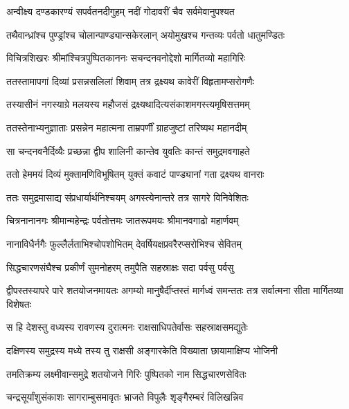 \twolineshloka
{अन्वीक्ष्य दण्डकारण्यं सपर्वतनदीगुहम्}
{नदीं गोदावरीं चैव सर्वमेवानुपश्यत} %

\twolineshloka
{तथैवान्ध्रांश्च पुण्ड्रांश्च चोलान्पाण्ड्यान्सकेरलान्}
{अयोमुखश्च गन्तव्यः पर्वतो धातुमण्डितः} %

\twolineshloka
{विचित्रशिखरः श्रीमांश्चित्रपुष्पितकाननः}
{सचन्दनवनोद्देशो मार्गितव्यो महागिरिः} %

\twolineshloka
{ततस्तामापगां दिव्यां प्रसन्नसलिलां शिवाम्}
{तत्र द्रक्ष्यथ कावेरीं विहृतामप्सरोगणैः} %

\twolineshloka
{तस्यासीनं नगस्याग्रे मलयस्य महौजसं}
{द्रक्ष्यथादित्यसंकाशमगस्त्यमृषिसत्तमम्} %

\twolineshloka
{ततस्तेनाभ्यनुज्ञाताः प्रसन्नेन महात्मना}
{ताम्रपर्णीं ग्राहजुष्टां तरिष्यथ महानदीम्} %

\twolineshloka
{सा चन्दनवनैर्दिव्यैः प्रच्छन्ना द्वीप शालिनी}
{कान्तेव युवतिः कान्तं समुद्रमवगाहते} %

\twolineshloka
{ततो हेममयं दिव्यं मुक्तामणिविभूषितम्}
{युक्तं कवाटं पाण्ड्यानां गता द्रक्ष्यथ वानराः} %

\twolineshloka
{ततः समुद्रमासाद्य संप्रधार्यार्थनिश्चयम्}
{अगस्त्येनान्तरे तत्र सागरे विनिवेशितः} %

\twolineshloka
{चित्रनानानगः श्रीमान्महेन्द्रः पर्वतोत्तमः}
{जातरूपमयः श्रीमानवगाढो महार्णवम्} %

\twolineshloka
{नानाविधैर्नगैः फुल्लैर्लताभिश्चोपशोभितम्}
{देवर्षियक्षप्रवरैरप्सरोभिश्च सेवितम्} %

\twolineshloka
{सिद्धचारणसंघैश्च प्रकीर्णं सुमनोहरम्}
{तमुपैति सहस्राक्षः सदा पर्वसु पर्वसु} %

\threelineshloka
{द्वीपस्तस्यापरे पारे शतयोजनमायतः}
{अगम्यो मानुषैर्दीप्तस्तं मार्गध्वं समन्ततः}
{तत्र सर्वात्मना सीता मार्गितव्या विशेषतः} %

\twolineshloka
{स हि देशस्तु वध्यस्य रावणस्य दुरात्मनः}
{राक्षसाधिपतेर्वासः सहस्राक्षसमद्युतेः} %

\twolineshloka
{दक्षिणस्य समुद्रस्य मध्ये तस्य तु राक्षसी}
{अङ्गारकेति विख्याता छायामाक्षिप्य भोजिनी} %

\twolineshloka
{तमतिक्रम्य लक्ष्मीवान्समुद्रे शतयोजने}
{गिरिः पुष्पितको नाम सिद्धचारणसेवितः} %

\twolineshloka
{चन्द्रसूर्यांशुसंकाशः सागराम्बुसमावृतः}
{भ्राजते विपुलैः शृङ्गैरम्बरं विलिखन्निव} %

